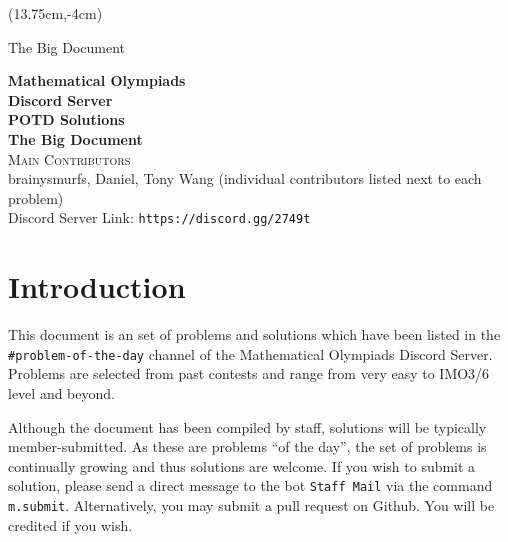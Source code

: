 \documentclass[10pt]{article}
\newcommand{\theissue}{The Big Document}
\newcounter{day}
\newcounter{solution}
\begin{document}
	\begin{titlepage}
		\begin{textblock*}{2cm}(13.75cm,-4cm) \begin{flushright}\theissue \end{flushright} \end{textblock*}
		\begin{center}
			\LARGE\textbf{Mathematical Olympiads\\Discord Server}\\
			\Huge\textbf{POTD Solutions}\\
			\Large\textbf{\theissue}\\
			\Large\textsc{Main Contributors}\\
			\normalsize{brainysmurfs, Daniel, Tony Wang (individual contributors listed next to each problem)}\\
			Discord Server Link: \texttt{https://discord.gg/2749t}\\
		\end{center}
	\end{titlepage}
\section{Introduction}

This document is an set of problems and solutions which have been listed in the \texttt{\#problem-of-the-day} channel of the Mathematical Olympiads Discord Server. Problems are selected from past contests and range from very easy to IMO3/6 level and beyond.

Although the document has been compiled by staff, solutions will be typically member-submitted. As these are problems ``of the day'', the set of problems is continually growing and thus solutions are welcome. If you wish to submit a solution, please send a direct message to the bot \texttt{Staff Mail} via the command \texttt{m.submit}. Alternatively, you may submit a pull request on Github. You will be credited if you wish.
\end{document}
